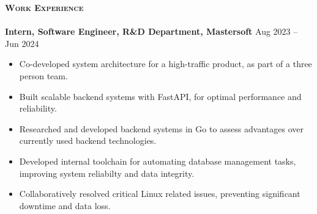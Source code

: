 \documentclass[a4paper]{article}
\newcommand{\lineunder} {
\vspace*{-8pt} \\
\hspace*{-18pt} \hrulefill \\
}
\newcommand{\header}[1]{%
{\hspace*{-18pt}\vspace*{6pt} \textsc{\textbf{\Large{#1}}}}%
\vspace*{-6pt} \lineunder
}
\begin{document}
\header{Work Experience}
\vspace{1mm}
\textbf{Intern, Software Engineer, R\&D Department, Mastersoft} \hfill Aug 2023 -- Jun 2024 \\
\vspace{-1mm}
\begin{itemize}

    \item Co-developed system architecture for a high-traffic product,
    as part of a three person team. \\
    \item Built scalable backend systems with FastAPI,
    for optimal performance and reliability. \\
    \item Researched and developed backend systems in Go to assess advantages
    over currently used backend technologies. \\
    \item Developed internal toolchain for automating database management tasks,
    improving system reliabilty and data integrity. \\
    \item Collaboratively resolved critical Linux related issues, 
    preventing significant downtime and data loss. \\

\end{itemize}
\end{document}
